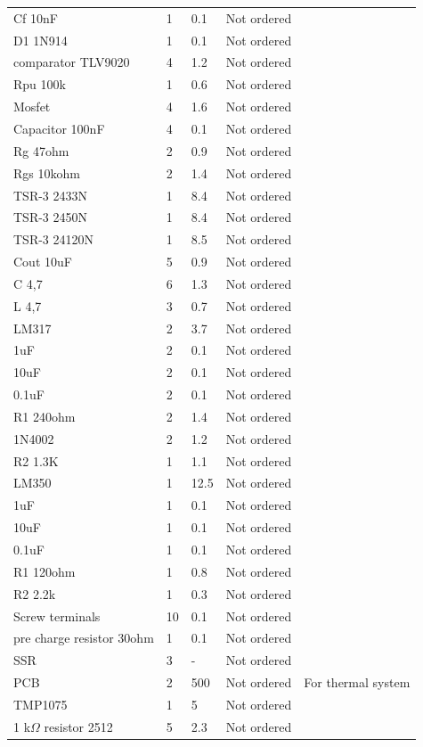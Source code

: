 \begin{longtable}{p{3cm}p{1.7cm}p{1.5cm}p{3cm}p{5cm}}
Cf 10nF & 1 & 0.1 & Not ordered &  \\
D1 1N914 & 1 & 0.1 & Not ordered &  \\
comparator TLV9020 & 4 & 1.2 & Not ordered &  \\
Rpu 100k & 1 & 0.6 & Not ordered &  \\
Mosfet & 4 & 1.6 & Not ordered &  \\
Capacitor 100nF & 4 & 0.1 & Not ordered &  \\
Rg 47ohm & 2 & 0.9 & Not ordered &  \\
Rgs 10kohm & 2 & 1.4 & Not ordered &  \\
TSR-3 2433N & 1 & 8.4 & Not ordered &  \\
TSR-3 2450N & 1 & 8.4 & Not ordered &  \\
TSR-3 24120N & 1 & 8.5 & Not ordered &  \\
Cout 10uF & 5 & 0.9 & Not ordered &  \\
C 4,7 & 6 & 1.3 & Not ordered &  \\
L 4,7 & 3 & 0.7 & Not ordered &  \\
LM317 & 2 & 3.7 & Not ordered &  \\
1uF & 2 & 0.1 & Not ordered &  \\
10uF & 2 & 0.1 & Not ordered &  \\
0.1uF & 2 & 0.1 & Not ordered &  \\
R1 240ohm & 2 & 1.4 & Not ordered &  \\
1N4002 & 2 & 1.2 & Not ordered &  \\
R2 1.3K & 1 & 1.1 & Not ordered &  \\
LM350 & 1 & 12.5 & Not ordered &  \\
1uF & 1 & 0.1 & Not ordered &  \\
10uF & 1 & 0.1 & Not ordered &  \\
0.1uF & 1 & 0.1 & Not ordered &  \\
R1 120ohm & 1 & 0.8 & Not ordered &  \\
R2 2.2k & 1 & 0.3 & Not ordered &  \\
Screw terminals & 10 & 0.1 & Not ordered &  \\
pre charge resistor 30ohm & 1 & 0.1 & Not ordered &  \\
SSR & 3 & - & Not ordered &  \\
PCB & 2 & 500 & Not ordered & For thermal system \\
TMP1075 & 1 & 5 & Not ordered &  \\
1 k$\Omega$ resistor 2512 & 5 & 2.3 & Not ordered &  \\

\end{longtable}
